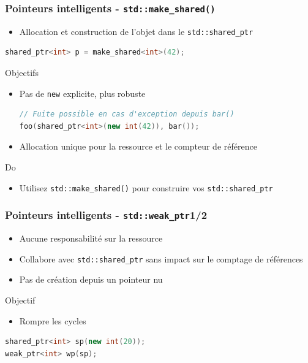 \documentclass[C++.tex]{subfiles}
\begin{document}
\begin{frame}[fragile]
	\frametitle{Pointeurs intelligents - \lstinline|std::make_shared()|}
	\begin{itemize}
		\item Allocation et construction de l'objet dans le \lstinline|std::shared_ptr|
	\end{itemize}

	\begin{lstlisting}[language=C++]
shared_ptr<int> p = make_shared<int>(42);\end{lstlisting}

	\begin{block}{Objectifs}
		\begin{itemize}
			\item Pas de \lstinline|new| explicite, plus robuste


			\begin{lstlisting}[language=C++]
// Fuite possible en cas d'exception depuis bar()
foo(shared_ptr<int>(new int(42)), bar());\end{lstlisting}

			\item Allocation unique pour la ressource et le compteur de référence
		\end{itemize}
	\end{block}

	\begin{exampleblock}{Do}
		\begin{itemize}
			\item Utilisez \lstinline|std::make_shared()| pour construire vos \lstinline|std::shared_ptr|
		\end{itemize}
	\end{exampleblock}
\end{frame}

\begin{frame}[fragile]
	\frametitle{Pointeurs intelligents - \lstinline|std::weak_ptr|\titlehfill{}1/2}
	\begin{itemize}
		\item Aucune responsabilité sur la ressource
		\item Collabore avec \lstinline|std::shared_ptr| sans impact sur le comptage de références
		\item Pas de création depuis un pointeur nu
	\end{itemize}

	\begin{block}{Objectif}
		\begin{itemize}
			\item Rompre les cycles 
		\end{itemize}
	\end{block}

	\begin{lstlisting}[language=C++]
shared_ptr<int> sp(new int(20));
weak_ptr<int> wp(sp);\end{lstlisting}
\end{frame}
\end{document}
